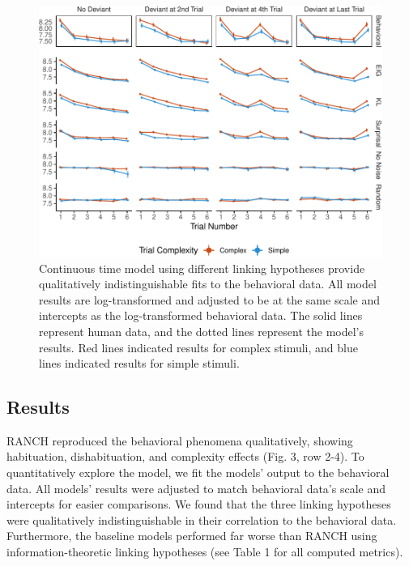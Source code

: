 \documentclass[10pt, letterpaper]{article}
\newenvironment{CodeChunk}{}{}
\begin{document}
\begin{CodeChunk}
\begin{figure}[h]

{\centering \includegraphics{figs/experiment_res-1} 

}

\caption[Continuous time model using different linking hypotheses provide qualitatively indistinguishable fits to the behavioral data]{Continuous time model using different linking hypotheses provide qualitatively indistinguishable fits to the behavioral data. All model results are log-transformed and adjusted to be at the same scale and intercepts as the log-transformed behavioral data. The solid lines represent human data, and the dotted lines represent the model's results. Red lines indicated results for complex stimuli, and blue lines indicated results for simple stimuli.}\label{fig:experiment_res}
\end{figure}
\end{CodeChunk}

\hypertarget{results-1}{%
\subsection{Results}\label{results-1}}

RANCH reproduced the behavioral phenomena qualitatively, showing
habituation, dishabituation, and complexity effects (Fig. 3, row 2-4).
To quantitatively explore the model, we fit the models' output to the
behavioral data. All models' results were adjusted to match behavioral
data's scale and intercepts for easier comparisons. We found that the
three linking hypotheses were qualitatively indistinguishable in their
correlation to the behavioral data. Furthermore, the baseline models
performed far worse than RANCH using information-theoretic linking
hypotheses (see Table 1 for all computed metrics).
\end{document}
